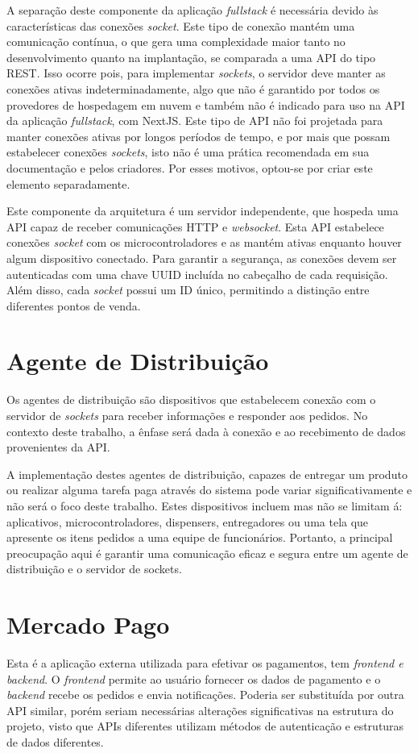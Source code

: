 A separação deste componente da aplicação \textit{fullstack} é necessária devido às características das conexões \textit{socket}. Este tipo de conexão mantém uma comunicação contínua, o que gera uma complexidade maior tanto no desenvolvimento quanto na implantação, se comparada a uma API do tipo REST. Isso ocorre pois, para implementar \textit{sockets}, o servidor deve manter as conexões ativas indeterminadamente, algo que não é garantido por todos os provedores de hospedagem em nuvem e também não é indicado para uso na API da aplicação \textit{fullstack}, com NextJS. Este tipo de API não foi projetada para manter conexões ativas por longos períodos de tempo, e por mais que possam estabelecer conexões \textit{sockets}, isto não é uma prática recomendada em sua documentação e pelos criadores. Por esses motivos, optou-se por criar este elemento separadamente.

Este componente da arquitetura é um servidor independente, que hospeda uma API capaz de receber comunicações HTTP e  \textit{websocket}. Esta \gls{API} estabelece conexões \textit{socket} com os microcontroladores e as mantém ativas enquanto houver algum dispositivo conectado. Para garantir a segurança, as conexões devem ser autenticadas com uma chave \gls{UUID} incluída no cabeçalho de cada requisição. Além disso, cada \textit{socket} possui um ID único, permitindo a distinção entre diferentes pontos de venda.

\section{Agente de Distribuição}

Os agentes de distribuição são dispositivos que estabelecem conexão com o servidor de \textit{sockets} para receber informações e responder aos pedidos. No contexto deste trabalho, a ênfase será dada à conexão e ao recebimento de dados provenientes da API.

A implementação destes agentes de distribuição, capazes de entregar um produto ou realizar alguma tarefa paga através do sistema pode variar significativamente e não será o foco deste trabalho. Estes dispositivos incluem mas não se limitam á: aplicativos, microcontroladores, dispensers, entregadores ou uma tela que apresente os itens pedidos a uma equipe de funcionários. Portanto, a principal preocupação aqui é garantir uma comunicação eficaz e segura entre um agente de distribuição e o servidor de sockets.

\section{Mercado Pago}
Esta é a aplicação externa utilizada para efetivar os pagamentos, tem \textit{frontend e backend}. O \textit{frontend} permite ao usuário fornecer os dados de pagamento e o \textit{backend} recebe os pedidos e envia notificações. Poderia ser substituída por outra API similar, porém seriam necessárias alterações significativas na estrutura do projeto, visto que APIs diferentes utilizam métodos de autenticação e estruturas de dados diferentes.

